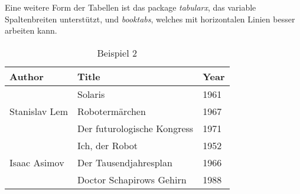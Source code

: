 Eine weitere Form der Tabellen ist das package \textit{tabularx}, das variable Spaltenbreiten unterstützt, und \textit{booktabs}, welches mit horizontalen Linien besser arbeiten kann.
\begin{table}
	\centering
	\caption{Beispiel 2}
	\begin{tabular}{|l|l|l|}
		\hline
		Author & Title & Year \\
		\hline
		\hline
		\multirow{3}{*}{Stanislav Lem} & Solaris & 1961 \\
 			& Robotermärchen & 1967 \\
 			& Der futurologische Kongress & 1971 \\
		\hline
		\multirow{3}{*}{Isaac Asimov} & Ich, der Robot & 1952 \\
 			& Der Tausendjahresplan & 1966 \\
 			& Doctor Schapirows Gehirn & 1988 \\
		\hline
	\end{tabular}
\label{tab:beispieltabelle2}
\end{table}